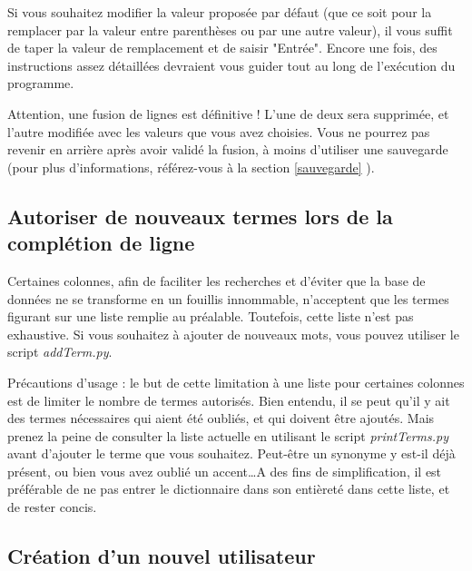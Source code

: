 \documentclass[12pt,a4paper]{article}
\begin{document}
        Si vous souhaitez modifier la valeur proposée par défaut (que ce soit pour la remplacer par la valeur
        entre parenthèses ou par une autre valeur), il vous suffit de taper la valeur de remplacement et de saisir
        "Entrée". Encore une fois, des instructions assez détaillées devraient vous guider
        tout au long de l'exécution du programme.

        Attention, une fusion de lignes est définitive ! L'une de deux sera supprimée, et l'autre modifiée avec les
        valeurs que vous avez choisies. Vous ne pourrez pas revenir en arrière après avoir validé la fusion,
        à moins d'utiliser une sauvegarde (pour plus d'informations, référez-vous à 
        la section \ref{sauvegarde} ).


    \bigskip


    \subsection{Autoriser de nouveaux termes lors de la complétion de ligne}\label{newterms}
        Certaines colonnes, afin de faciliter les recherches et d'éviter que la base
        de données ne se transforme en un fouillis innommable, n'acceptent que les termes
        figurant sur une liste remplie au préalable. Toutefois, cette liste n'est pas
        exhaustive. Si vous souhaitez à ajouter de nouveaux mots, vous pouvez utiliser
        le script \emph{addTerm.py}.

        Précautions d'usage : le but de cette limitation à une liste pour certaines colonnes
        est de limiter le nombre de termes autorisés. Bien entendu, il se peut qu'il y ait des
        termes nécessaires qui aient été oubliés, et qui doivent être ajoutés.
        Mais prenez la peine de consulter la liste actuelle en utilisant le script \emph{printTerms.py}
        avant d'ajouter le terme que vous souhaitez.
        Peut-être un synonyme y est-il déjà présent, ou bien vous avez
        oublié un accent\dots A des fins de simplification, il est préférable de ne pas entrer
        le dictionnaire dans son entièreté dans cette liste, et de rester concis.




    \subsection{Création d'un nouvel utilisateur}\label{nouvelutilisateur}
\end{document}
